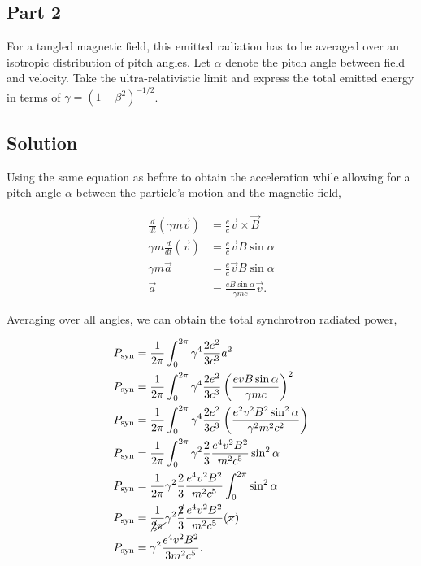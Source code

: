 \documentclass[12pt]{article}
\begin{document}
\subsection*{Part 2}

For a tangled magnetic field, this emitted radiation has to be averaged over an isotropic distribution of pitch angles. Let $\alpha$ denote the pitch angle between field and velocity. Take the ultra-relativistic limit and express the total emitted energy in terms of $\gamma = (1 - \beta^2)^{-1/2}$.


\subsection*{Solution}

Using the same equation as before to obtain the acceleration while allowing for a pitch angle $\alpha$ between the particle's motion and the magnetic field,

\begin{equation*}
\begin{split}
    \frac{d}{dt}(\gamma m\vec{v}) &= \frac{e}{c} \vec{v} \times \vec{B} \\
    \gamma m \frac{d}{dt}(\vec{v}) &= \frac{e}{c} \vec{v} B \sin\alpha \\
    \gamma m \vec{a} &= \frac{e}{c} \vec{v} B \sin\alpha \\
    \vec{a} &= \frac{eB\sin\alpha}{\gamma mc} \vec{v}.
\end{split}
\end{equation*}

{\noindent}Averaging over all angles, we can obtain the total synchrotron radiated power,

\begin{equation*}
\begin{split}
    P_\mathrm{syn} &= \frac{1}{2\pi}\int_0^{2\pi} \gamma^4 \frac{2e^2}{3c^3}a^2 \\
    P_\mathrm{syn} &= \frac{1}{2\pi}\int_0^{2\pi} \gamma^4 \frac{2e^2}{3c^3} \left(\frac{evB\sin\alpha}{\gamma mc}\right)^2 \\
    P_\mathrm{syn} &= \frac{1}{2\pi}\int_0^{2\pi} \gamma^4 \frac{2e^2}{3c^3} \left(\frac{e^2v^2B^2\sin^2\alpha}{\gamma^2 m^2c^2}\right) \\
    P_\mathrm{syn} &= \frac{1}{2\pi}\int_0^{2\pi} \gamma^2 \frac{2}{3} \frac{e^4v^2B^2}{m^2c^5} \sin^2\alpha \\
    P_\mathrm{syn} &= \frac{1}{2\pi} \gamma^2 \frac{2}{3} \frac{e^4v^2B^2}{m^2c^5} \int_0^{2\pi}\sin^2\alpha \\
    P_\mathrm{syn} &= \frac{1}{\cancel{2}\cancel{\pi}} \gamma^2 \frac{\cancel{2}}{3} \frac{e^4v^2B^2}{m^2c^5} (\cancel{\pi}) \\
    P_\mathrm{syn} &= \gamma^2 \frac{e^4v^2B^2}{3m^2c^5}.
\end{split}
\end{equation*}
\end{document}
